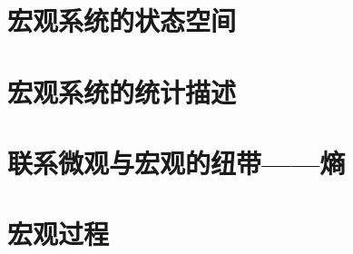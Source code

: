 \section{宏观系统的状态空间}

\section{宏观系统的统计描述}

\section{联系微观与宏观的纽带——熵}

\section{宏观过程}
















\ifx\allfiles\undefined

\fi
